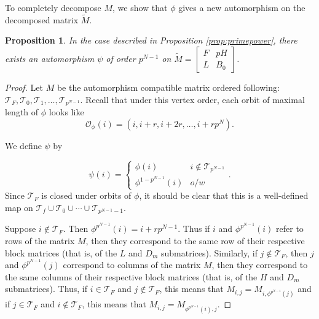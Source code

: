 \documentclass[preprint,12pt]{elsarticle}
\newcommand{\cT}{\mathcal{T}}
\newcommand{\tM}{\tilde{M}}
\renewcommand{\so}{\mathscr{O}}
\newtheorem{prop}[thm]{Proposition}
\theoremstyle{definition}
\theoremstyle{remark}
\begin{document}
To completely decompose $M$, we show that $\phi$ gives a new automorphism on the decomposed matrix $\tM$.
\begin{prop}\label{prop:primepowerautom}
In the case described in Proposition \ref{prop:primepower}, there exists an  automorphism $\psi$ of order $ p^{N-1}$ on $\tM = \left[\begin{array}{rr} F & pH \\ L & B_0 \end{array}\right] $.
\end{prop}
\begin{proof}

Let $M$ be the automorphism compatible matrix ordered following: $\cT_F, \cT_0, \cT_1, \ldots, \cT_{p^{N-1}}$.  Recall that under this vertex order, each orbit of maximal length of $\phi$ looks like
\[
\so_\phi(i) = (i, i + r, i + 2r, \ldots, i + rp^N).
\]

We define $\psi$ by

\[
\psi(i) = \left\{\begin{array}{ll}
\phi(i) & i \notin \cT_{p^{N-1}}\\
\phi^{1-p^{N-1}}(i) & o/w
\end{array}\right. .
\]
Since $\cT_F$ is closed under orbits of $\phi$, it should be clear that this is a well-defined map on $\cT_f \cup \cT_0 \cup \cdots \cup \cT_{p^{N-1}-1}$.

Suppose $i \notin \cT_F$.  Then $\phi^{p^{N-1}}(i) = i + rp^{N-1}$.  Thus if $i$ and $\phi^{p^{N-1}}(i) $ refer to rows of the matrix $M$, then they correspond to the same row of their respective block matrices (that is, of the $L$ and $D_m$ submatrices).
Similarly, if $j \notin \cT_F$, then $j$ and $\phi^{p^{N-1}}(j)$ correspond to columns of the matrix $M$, then they correspond to the same columns of their respective block matrices (that is, of the $H$ and $D_m$ submatrices). Thus, if $i \in \cT_F$ and $j \notin \cT_F$, this means that $M_{i,j} = M_{i, \phi^{p^{N-1}}(j)}$ and if $j \in \cT_F$ and $i \notin \cT_F$, this means that $M_{i,j} = M_{\phi^{p^{N-1}}(i), j}$.


\end{proof}
\end{document}
